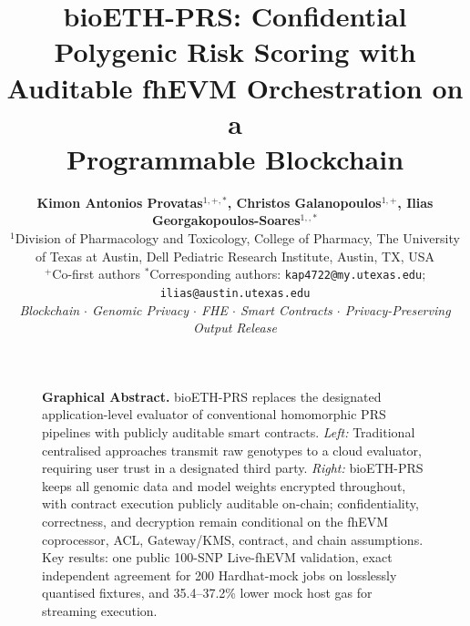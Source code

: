 \documentclass[10pt,twocolumn]{article}
\title{\textbf{bioETH-PRS: Confidential Polygenic Risk Scoring with\\[2pt]
       Auditable fhEVM Orchestration on a\\[2pt]
       Programmable Blockchain}}
\author{%
  \begin{minipage}{\textwidth}
  \raggedright
  \textbf{Kimon Antonios Provatas$^{1,+,*}$, Christos Galanopoulos$^{1,+}$, Ilias Georgakopoulos-Soares$^{1,,*}$}\\[2pt]
  \normalsize $^{1}$Division of Pharmacology and Toxicology, College of Pharmacy, The University of Texas at Austin, Dell Pediatric Research Institute, Austin, TX, USA\\[2pt]
  \small $^{+}$Co-first authors \quad $^{*}$Corresponding authors: \texttt{kap4722@my.utexas.edu}; \texttt{ilias@austin.utexas.edu}\\[2pt]
  \small\textit{Blockchain $\cdot$ Genomic Privacy $\cdot$ FHE $\cdot$ Smart Contracts $\cdot$ Privacy-Preserving Output Release}
  \end{minipage}
}
\date{}
\begin{document}
\linenumbers
\maketitle
\thispagestyle{fancy}

\begin{figure}[t]
  \centering
  \hfill
  \caption{\textbf{Graphical Abstract.}  bioETH-PRS replaces the designated
  application-level evaluator of conventional homomorphic PRS pipelines with publicly
  auditable smart contracts.
  \emph{Left:} Traditional centralised approaches transmit raw genotypes to a cloud evaluator,
  requiring user trust in a designated third party.
  \emph{Right:} bioETH-PRS keeps all genomic data and model weights encrypted throughout,
  with contract execution publicly auditable on-chain; confidentiality, correctness,
  and decryption remain conditional on the fhEVM coprocessor, ACL, Gateway/KMS,
  contract, and chain assumptions.  Key results: one public 100-SNP Live-fhEVM
  validation, exact independent agreement for 200 Hardhat-mock jobs on losslessly
  quantised fixtures, and 35.4--37.2\% lower mock host gas for streaming execution.}
  \label{fig:graphical_abstract}
\end{figure}
\end{document}
